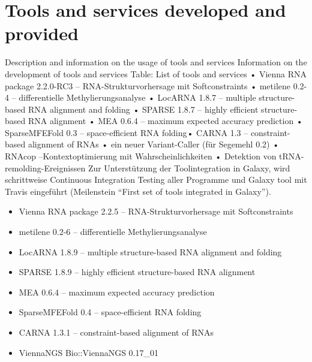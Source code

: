 \documentclass{article}
\begin{document}
\begin{comment}
 Bez\"uglich Workpackages 7.3 und 8.1 wurde eine Summer
School zu RNA-Seq f\"ur SPP 1738 durchgeführt, die in Zusammenarbeit
mit dem Bioinformatik-Dienstleister ecSeq abgehalten wurde. Die
dar\"uberhinausgehende Kooperation mit ecSeq ist angebahnt. Die
Dokumentation unserer Tools wurde weitergepflegt; eine Reihe von Tools
wurde in die ELIXIR-Registry, die zentrale Katalogisierung und
standardisierte Beschreibung von Bioinformatik-Tools erm\"oglicht,
eingetragen und diese Registry in Kooperation mit ELIXIR
weiterentwickelt.
\end{comment}


\section*{Tools and services developed and provided}
\label{sec:tools}
Description and information on the usage of tools and services
Information on the development of tools and services 
Table: List of tools and services 
• Vienna RNA package 2.2.0-RC3 – RNA-Strukturvorhersage mit Softconstraints
• metilene 0.2-4 – differentielle Methylierungsanalyse
• LocARNA 1.8.7 – multiple structure-based RNA alignment and folding
• SPARSE 1.8.7 – highly efficient structure-based RNA alignment
• MEA 0.6.4 – maximum expected accuracy prediction
• SparseMFEFold 0.3 – space-efficient RNA folding• CARNA 1.3 – constraint-based alignment of RNAs
• ein neuer Variant-Caller (für Segemehl 0.2)
• RNAcop –Kontextoptimierung mit Wahrscheinlichkeiten
• Detektion von tRNA-remolding-Ereignissen
Zur Unterstützung der Toolintegration in Galaxy, wird schrittweise Continuous Integration Testing
aller Programme und Galaxy tool mit Travis eingeführt (Meilenstein “First set of tools integrated in
Galaxy”).

\begin{itemize}
\item Vienna RNA package 2.2.5 – RNA-Strukturvorhersage mit
  Softconstraints
\item metilene 0.2-6 – differentielle Methylierungsanalyse
\item LocARNA 1.8.9 – multiple structure-based RNA alignment and
  folding
\item SPARSE 1.8.9 – highly efficient structure-based RNA alignment
\item MEA 0.6.4 – maximum expected accuracy prediction
\item SparseMFEFold 0.4 – space-efficient RNA folding
\item CARNA 1.3.1 – constraint-based alignment of RNAs
\item ViennaNGS Bio::ViennaNGS 0.17\_01
\end{itemize}
\end{document}
